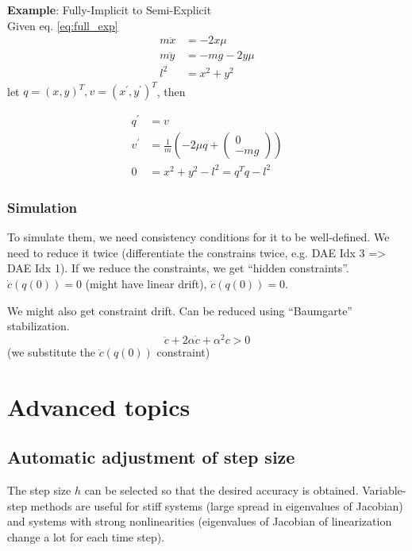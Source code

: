 \textbf{Example}: Fully-Implicit to Semi-Explicit \\
Given eq. \ref{eq:full_exp}
\begin{equation}\label{eq:full_exp}
    \begin{aligned}
        m \ddot{x} &=-2 x \mu \\
        m \ddot{y} &=-m g-2 y \mu \\
        l^{2} &=x^{2}+y^{2}
    \end{aligned}
\end{equation}
let $q=(x, y)^{T}, v=\left(x^{\prime}, y^{\prime}\right)^{T}$, then 

\begin{equation}
    \begin{aligned}
        q^{\prime} &=v \\
        v^{\prime} &=\frac{1}{m}\left(-2 \mu q+\left(\begin{array}{c}
        0 \\
        -m g
        \end{array}\right)\right) \\
        0 &=x^{2}+y^{2}-l^{2}=q^{T} q-l^{2}
        \end{aligned}
\end{equation}

\subsubsection{Simulation}
To simulate them, we need consistency conditions for it to be well-defined. We need to reduce it twice (differentiate the constrains twice, e.g. DAE Idx 3 => DAE Idx 1). If we reduce the constraints, we get “hidden constraints”. $\dot{c}(q(0)) = 0$ (might have linear drift), $\ddot{c}(q(0)) = 0$.

We might also get constraint drift. Can be reduced using “Baumgarte” stabilization.
\begin{equation}
    \ddot{c} + 2\alpha\dot{c} + \alpha^2c > 0
\end{equation}
(we substitute the $\ddot{c}(q(0))$ constraint)


\section{Advanced topics}

\subsection{Automatic adjustment of step size}
The step size $h$ can be selected so that the desired accuracy is obtained. Variable-step methods are useful for stiff systems (large spread in eigenvalues of Jacobian) and systems with strong nonlinearities (eigenvalues of Jacobian of linearization change a lot for each time step).

